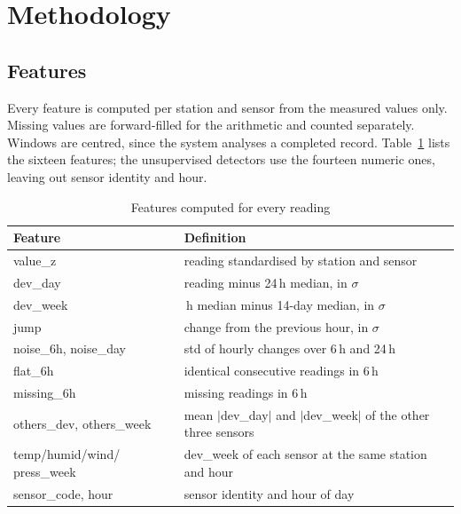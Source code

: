 \documentclass[conference]{IEEEtran}
\begin{document}
\section{Methodology}
\subsection{Features}
Every feature is computed per station and sensor from the measured values only. Missing values are
forward-filled for the arithmetic and counted separately. Windows are centred, since the system
analyses a completed record. Table~\ref{tab:features} lists the sixteen features; the unsupervised
detectors use the fourteen numeric ones, leaving out sensor identity and hour.

\begin{table}[t]
\caption{Features computed for every reading}
\label{tab:features}
\centering
\begin{tabular}{@{}>{\raggedright\arraybackslash}p{2.2cm}>{\raggedright\arraybackslash}p{5.6cm}@{}}
\toprule
Feature & Definition \\
\midrule
value\_z & reading standardised by station and sensor \\
dev\_day & reading minus 24\,h median, in $\sigma$ \\
dev\_week & 24\,h median minus 14-day median, in $\sigma$ \\
jump & change from the previous hour, in $\sigma$ \\
noise\_6h, noise\_day & std of hourly changes over 6\,h and 24\,h \\
flat\_6h & identical consecutive readings in 6\,h \\
missing\_6h & missing readings in 6\,h \\
others\_dev, others\_week & mean $|$dev\_day$|$ and $|$dev\_week$|$ of the other three sensors \\
temp/humid/wind/ press\_week & dev\_week of each sensor at the same station and hour \\
sensor\_code, hour & sensor identity and hour of day \\
\bottomrule
\end{tabular}
\end{table}
\end{document}
